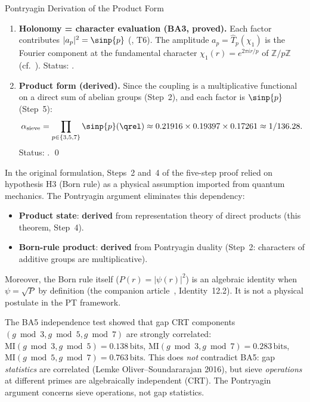 \documentclass[12pt,a4paper]{article}
\begin{document}
\begin{thmbox}{Pontryagin Derivation of the Product Form}
\begin{enumerate}[leftmargin=*, label=\textbf{Step \arabic*.}]
\item \textbf{Holonomy = character evaluation (BA3, proved).}
  Each factor contributes $|a_p|^2 = \sinp{p}$ (\cite{companion_M2}, T6).
  The amplitude $a_p = \hat{T}_p(\chi_1)$ is the Fourier component at the
  fundamental character $\chi_1(r) = e^{2\pi i r/p}$ of $\mathbb{Z}/p\mathbb{Z}$
  (cf.\ \cite{companion_M2}). Status: \THMTAG.

\item \textbf{Product form (derived).}
  Since the coupling is a multiplicative functional on a direct sum
  of abelian groups (Step~2), and each factor is $\sinp{p}$ (Step~5):
  \begin{equation}
    \alpha_{\rm sieve} = \prod_{p \in \{3,5,7\}} \sinp{p}(\qrel)
    \approx 0.21916 \times 0.19397 \times 0.17261 \approx 1/136.28.
    \label{eq:alpha_bare:ch09}
  \end{equation}
  Status: \DERTAG. \qed
\end{enumerate}
\end{thmbox}

\begin{remark}
\label{rem:pontryagin_upgrade}
In the original formulation, Steps~2 and~4 of the five-step proof
relied on hypothesis H3 (Born rule) as a physical assumption imported
from quantum mechanics. The Pontryagin argument eliminates this
dependency:
\begin{itemize}[nosep]
\item \textbf{Product state}: \textbf{derived} from representation
  theory of direct products (this theorem, Step~4).
\item \textbf{Born-rule product}: \textbf{derived} from Pontryagin
  duality (Step~2: characters of additive groups are multiplicative).
\end{itemize}
Moreover, the Born rule itself ($P(r) = |\psi(r)|^2$) is an algebraic
identity when $\psi = \sqrt{P}$ by definition (the companion article~\cite{companion_physics},
Identity~12.2). It is not a physical postulate in the PT framework.
\end{remark}

\begin{remark}
\label{rem:MI_test}
The BA5 independence test showed that gap CRT components
$(g \bmod 3, g \bmod 5, g \bmod 7)$ are strongly correlated:
$\mathrm{MI}(g\!\bmod 3, g\!\bmod 5) = 0.138\,\mathrm{bits}$,
$\mathrm{MI}(g\!\bmod 3, g\!\bmod 7) = 0.283\,\mathrm{bits}$,
$\mathrm{MI}(g\!\bmod 5, g\!\bmod 7) = 0.763\,\mathrm{bits}$.
This does \emph{not} contradict BA5: gap \emph{statistics} are
correlated (Lemke Oliver--Soundararajan 2016), but sieve
\emph{operations} at different primes are algebraically independent
(CRT). The Pontryagin argument concerns sieve operations, not gap
statistics.
\end{remark}
\end{document}
